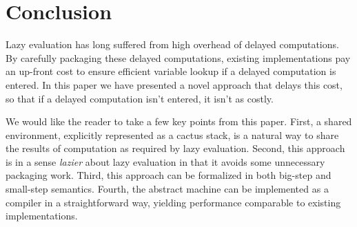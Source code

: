\section{Conclusion} \label{sec:conc}

Lazy evaluation has long suffered from high overhead of delayed computations. By
carefully packaging these delayed computations, existing implementations pay an
up-front cost to ensure efficient variable lookup if a delayed computation is
entered. In this paper we have presented a novel approach that delays this cost,
so that if a delayed computation isn't entered, it isn't as costly. 

We would like the reader to take a few key points from this paper. First, a
shared environment, explicitly represented as a cactus stack, is a natural
way to share the results of computation as required by lazy evaluation. Second,
this approach is in a sense \emph{lazier} about lazy evaluation in that it
avoids some unnecessary packaging work. Third, this approach can be formalized
in both big-step and small-step semantics. Fourth, the abstract machine can be
implemented as a compiler in a straightforward way, yielding performance
comparable to existing implementations. 
